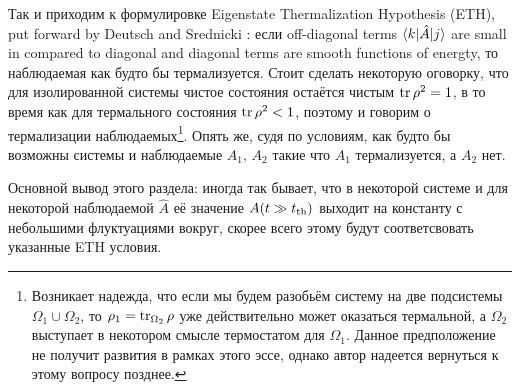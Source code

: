 Так и приходим к формулировке Eigenstate Thermalization Hypothesis (ETH), put forward by Deutsch \cite{PhysRevA.43.2046} and Srednicki \cite{PhysRevE.50.888}: если off-diagonal terms $\bk{k}[\hat{A}]{j}$ are small in compared to diagonal and diagonal terms are smooth functions of energty, то наблюдаемая как будто бы термализуется.  Стоит сделать некоторую оговорку, что для изолированной системы чистое состояния остаётся чистым $\mathop{\mathrm{tr}}\nolimits \rho^2 = 1$, в то время как для термального состояния $\mathop{\mathrm{tr}}\nolimits \rho^2 < 1$, поэтому и говорим о термализации наблюдаемых\footnote{
	Возникает надежда, что если мы будем разобьём систему на две подсистемы $\Omega_1 \cup \Omega_2$, то $\rho_1 = \mathop{\mathrm{tr}}\nolimits_{\Omega_2} \rho$ уже действительно может оказаться термальной, а $\Omega_2$ выступает в некотором смысле термостатом для $\Omega_1$. Данное предположение не получит развития в рамках этого эссе, однако автор надеется вернуться к этому вопросу позднее.
}. Опять же, судя по условиям, как будто бы возможны системы и наблюдаемые $A_1,\, A_2$ такие что $A_1$ термализуется, а $A_2$ нет. 

Основной вывод этого раздела: иногда так бывает, что в некоторой системе и для некоторой наблюдаемой $\hat{A}$ её значение $A(t \gg t_{\textnormal{th}})$ выходит на константу с небольшими флуктуациями вокруг, скорее всего этому будут соответсвовать указанные ETH условия.


